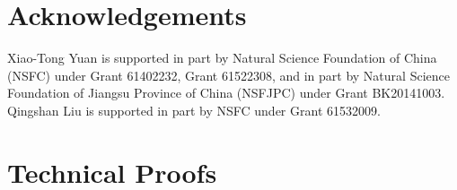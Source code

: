 \documentclass[11pt]{article}
\numberwithin{equation}{section}
\numberwithin{table}{section}
\numberwithin{figure}{section}
\begin{document}
\section*{Acknowledgements}
Xiao-Tong Yuan is supported in part by Natural Science Foundation of China (NSFC) under Grant 61402232, Grant 61522308, and in part by Natural Science Foundation of Jiangsu Province of China (NSFJPC) under Grant BK20141003. Qingshan Liu is supported in part by NSFC under Grant 61532009.

\newpage

\newpage

\onecolumn
\appendix
\section{Technical Proofs}
\end{document}
